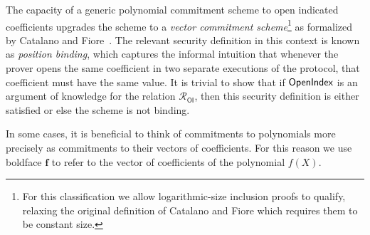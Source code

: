 \documentclass{article}
\theoremstyle{definition}
\begin{document}
The capacity of a generic polynomial commitment scheme to open indicated coefficients upgrades the scheme to a \emph{vector commitment scheme}\footnote{For this classification we allow logarithmic-size inclusion proofs to qualify, relaxing the original definition of Catalano and Fiore which requires them to be constant size.} as formalized by Catalano and Fiore~\cite{PKC:CatFio13}. The relevant security definition in this context is known as \emph{position binding}, which captures the informal intuition that whenever the prover opens the same coefficient in two separate executions of the protocol, that coefficient must have the same value. It is trivial to show that if $\textsf{{OpenIndex}}$ is an argument of knowledge for the relation $\mathcal{R}_\mathsf{OI}$, then this security definition is either satisfied or else the scheme is not binding.

In some cases, it is beneficial to think of commitments to polynomials more precisely as commitments to their vectors of coefficients. For this reason we use boldface $\mathbf{f}$ to refer to the vector of coefficients of the polynomial $f(X)$.
 
\begin{comment}
\paragraph{Inner product argument} Another helpful feature for polynomial commitment schemes is an inner product argument that shows for commitments $(c_1, c_2)$ to degree $d$ polynomials $(f_1, f_2)$ the inner product of their coefficient vectors $a = \langle f_1, f_2 \rangle$. More formally, this is an interactive argument for the relation: 

\[ 
\mathcal{R_\textsf{Prod}}(\params) = \left\{
\langle (c_1, c_2, a, d), (f_1, f_2, r_1, r_2) \rangle
: 
\begin{array}{l} 
f_1, f_2 \in R[X] \ \text{is degree} \ d \ \\
\langle f_1, f_2 \rangle = a \\ 
 \text{and} \ \pro{Open}(\params, c_1, f_1, r_1) = 1 \\
 \text{and} \ \pro{Open}(\params, c_2, f_2, r_2) = 1
\end{array}
\right\}
\] 

Unlike the opening of individual coefficients, we do not know a generic protocol for the inner product argument based solely on $\eval$. However, we do construct a simple inner-product argument in Section~\ref{section:inner_product} for our particular construction of polynomial commitments in generic groups of unknown order.  
\end{comment}
\end{document}
